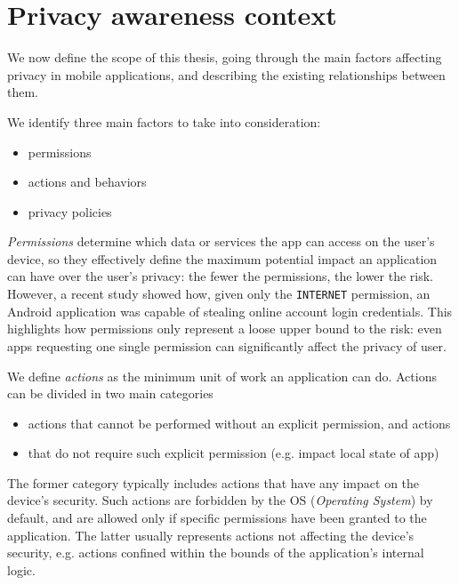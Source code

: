 \section{Privacy awareness context}
We now define the scope of this thesis, going through the main factors affecting privacy in mobile applications, and describing the existing relationships between them.

We identify three main factors to take into consideration:
\begin{itemize}
  \item permissions
  \item actions and behaviors
  \item privacy policies
\end{itemize}

\emph{Permissions} determine which data or services the app can access on the user's device, so they effectively define the maximum potential impact an application can have over the user's privacy: the fewer the permissions, the lower the risk. However, a recent study \cite{stickley} showed how, given only the \texttt{INTERNET} permission, an Android application was capable of stealing online account login credentials.
This highlights how permissions only represent a loose upper bound to the risk: even apps requesting one single permission can significantly affect the privacy of user.


We define \emph{actions} as the minimum unit of work an application can do. Actions can be divided in two main categories

\begin{itemize}
  \item actions that cannot be performed without an explicit permission, and actions
  \item that do not require such explicit permission (e.g. impact local state of app)
\end{itemize}
The former category typically includes actions that have any impact on the device's security. Such actions are forbidden by the OS (\emph{Operating System}) by default, and are allowed only if specific permissions have been granted to the application. The latter usually represents actions not affecting the device's security, e.g. actions confined within the bounds of the application's internal logic.

